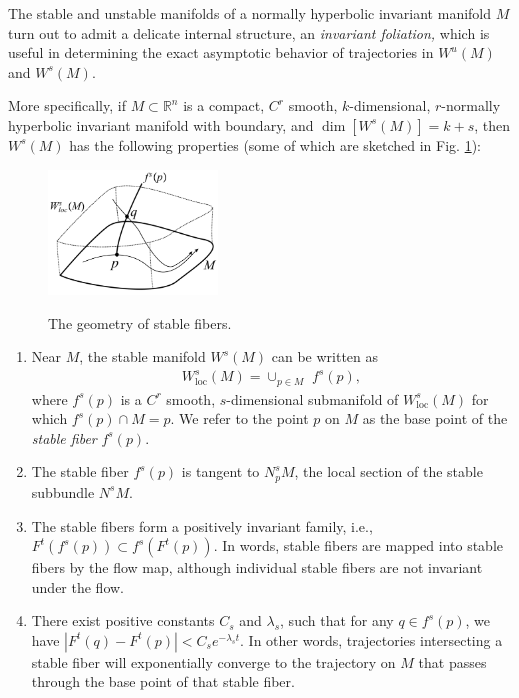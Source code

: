\begin{ex}
\begin{exercise}
The stable and unstable manifolds of a normally hyperbolic invariant manifold $M$ turn out to admit a delicate internal structure, an \emph{invariant foliation, }which is useful in determining the exact asymptotic behavior of trajectories in $W^{u}(M)$ and $W^{s}(M)$.

More specifically, if $M\subset\mathbb{R}^{n}$ is a compact, $C^{r}$ smooth, $k$-dimensional, $r$-normally hyperbolic invariant manifold with boundary, and $\dim\left[W^{s}(M)\right]=k+s$, then $W^{s}(M)$ has the following properties (some of which are sketched
in Fig. \ref{fig:ex95}):
\begin{figure}[h]
\begin{centering}
	\includegraphics[width=0.4\textwidth]{figures/ch9/Series/fibre.png}
\label{fig:ex95}
\caption{The geometry of stable fibers.}
\end{centering}
\end{figure}

\begin{enumerate}
	\item Near $M$, the stable manifold $W^{s}(M)$ can be written as
\begin{align}
W_{\mathrm{loc}}^{s}(M)=\cup_{p\in M}\,\,f^{s}(p),
\end{align}
where $f^{s}(p)$ is a $C^{r}$ smooth, $s$-dimensional submanifold
of $W_{\mathrm{loc}}^{s}(M)$ for which $f^{s}(p)\cap M=p$. We refer
to the point $p$ on $M$ as the base point of the \emph{stable fiber
}$f^{s}(p)$.

\item The stable fiber $f^{s}(p)$ is tangent to $N_{p}^{s}M$, the
local section of the stable subbundle $N^{s}M.$

\item The stable fibers form a positively invariant family, i.e.,
$F^{t}(f^{s}(p))\subset f^{s}(F^{t}(p))$. In words, stable fibers
are mapped into stable fibers by the flow map, although individual
stable fibers are not invariant under the flow.

\item There exist positive constants $C_{s}$ and $\lambda_{s}$, such
that for any $q\in f^{s}(p)$, we have $\left\vert F^{t}(q)-F^{t}(p)\right\vert <C_{s}e^{-\lambda_{s}t}.$
In other words, trajectories intersecting a stable fiber will exponentially
converge to the trajectory on $M$ that passes through the base point
of that stable fiber.


\end{enumerate}
\end{exercise}
\end{ex}
